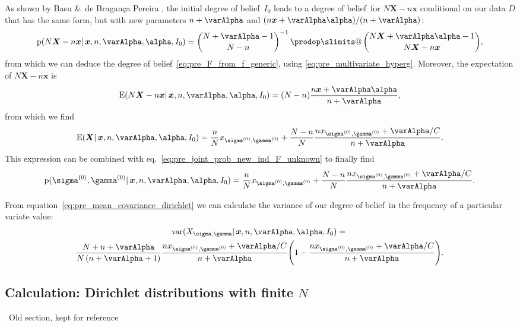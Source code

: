 \documentclass[\ifafour a4paper,12pt,\else a5paper,10pt,\fi%
onecolumn,oneside,article,%
british%
]{memoir}
\makeatletter
\theoremstyle{remark}
\theoremstyle{innote}
\def\prod{\DOTSI\prodop\slimits@}
\newcommand*{\citey}{\parencites*}
\newcommand*{\amp}{\&}
\newcommand*{\pf}{\mathrm{p}}%
\renewcommand*{\|}{\mathpunct{|}}
\newcommand*{\sect}{\S}%
\newcommand*{\eqn}{eq.}%
\newcommand*{\tprod}{\mathop{\textstyle\prod}\nolimits}
\newcommand*{\E}{\mathrm{E}}
\newcommand*{\puzzle}{\maltese}
\newcommand{\mynote}[1]{ {\color{notecolour}\puzzle\ #1}}
\DeclareMathOperator{\var}{var}
\newcommand*{\dob}{degree of belief}
\newcommand*{\yD}{D}
\newcommand*{\yprod}{\tprod}
\newcommand*{\ys}{\sigma}
\newcommand*{\yg}{\gamma}
\newcommand*{\ysi}[1]{\ys^{(#1)}}
\newcommand*{\ygi}[1]{\yg^{(#1)}}
\newcommand*{\yso}{\ysi{0}}
\newcommand*{\ygo}{\ygi{0}}
\newcommand*{\yF}{\bm{X}}
\newcommand*{\yf}{\bm{x}}
\newcommand*{\yIo}{I_{0}}
\newcommand*{\yA}{\varAlpha}
\newcommand*{\ya}{\bm{\alpha}}
\makeatother
\begin{document}
As shown by Basu \amp\ de Bragan\c{c}a Pereira \citey[\sect~4,
Theorem~2]{basuetal1982}, the initial \dob\ $\yIo$ leads to a \dob\ for
$N\yF-n\yf$ conditional on our data $\yD$ that has the same form, but with
new parameters $n+\yA$ and $(n\yf+\yA\ya)/(n+\yA)$:
\begin{equation}
  \label{eq:pre_dirichlet_posterior_X}
  \pf(N\yF -n\yf \| \yf, n, \yA, \ya,\yIo) =
  \binom{N+\yA-1}{N-n}^{-1} \yprod\binom{N\yF+\yA\ya-1}{N\yF-n\yf},
\end{equation}
from which we can deduce the \dob~\eqref{eq:pre_F_from_f_generic}, using
\eqref{eq:pre_multivariate_hyperg}. Moreover, the expectation of $N\yF-n\yf$ is
\citey[\sect~3]{basuetal1982}
\begin{equation}
  \label{eq:pre_dirichlet_posterior_expectation}
  \E(N\yF -n\yf \| \yf, n, \yA, \ya,\yIo) =
  (N-n) \frac{n\yf+\yA\ya}{n+\yA},
\end{equation}
from which we find
\begin{equation}
    \label{eq:pre_expect_freq_dirichlet_prior_final}
    \E(\yF \| \yf, n,\yA,\ya, \yIo)  =
    \frac{n}{N}x_{\yso, \ygo} + \frac{N-n}{N}
\frac{n x_{\yso, \ygo}+\yA/C}{n+\yA}.
\end{equation}
This expression can be combined with
\eqn~\eqref{eq:pre_joint_prob_new_ind_F_unknown} to finally find
\begin{equation}
    \label{eq:pre_joint_prob_new_ind_full_dirichlet_prior_final}
    \pf(\yso, \ygo \| \yf, n,\yA,\ya, \yIo)  =
    \frac{n}{N}x_{\yso, \ygo} + \frac{N-n}{N}
\frac{n x_{\yso, \ygo}+\yA/C}{n+\yA}.
\end{equation}

From equation~\eqref{eq:pre_mean_covariance_dirichlet} we can calculate the
variance of our \dob\ in the frequency of a particular variate value:
\begin{multline}
  \label{eq:pre_variance_single_gene_dirichlet}
  \var(X_{\ys,\yg} \| \yf, n,\yA,\ya, \yIo)  ={}\\
  \frac{N+n+\yA}{N\,(n+\yA+1)}
  \frac{n x_{\yso, \ygo}+\yA/C}{n+\yA}
  \Biggl(1- \frac{n x_{\yso, \ygo}+\yA/C}{n+\yA} \Biggr).
\end{multline}


\subsection*{Calculation: Dirichlet distributions with finite $N$}

\mynote{Old section, kept for reference}
\end{document}
